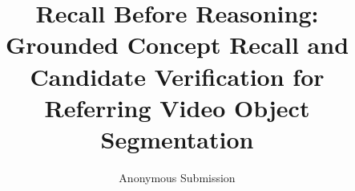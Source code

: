 \documentclass[10pt,twocolumn,letterpaper]{article}
\title{Recall Before Reasoning: Grounded Concept Recall and Candidate Verification for Referring Video Object Segmentation}
\author{Anonymous Submission}
\date{}
\begin{document}
\maketitle






\clearpage
{\small}
\end{document}
